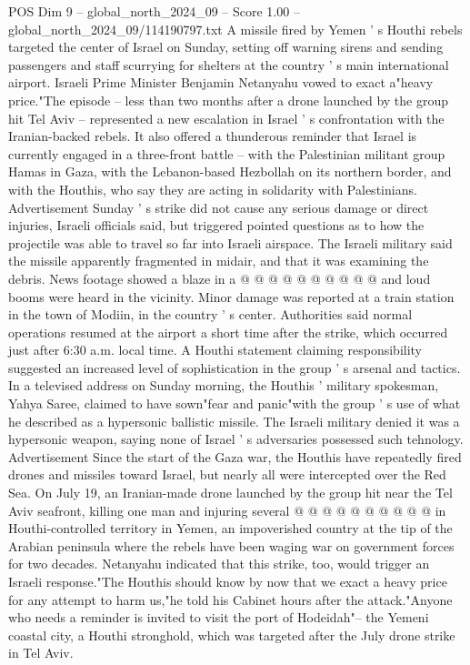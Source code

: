 \begin{textsample}{POS Dim 9 – global\_north\_2024\_09 – Score 1.00 – global\_north\_2024\_09/114190797.txt}  \label{ex:f9_pos_248}
A missile fired by Yemen ' s Houthi rebels targeted the center of Israel on Sunday, setting off warning sirens and sending passengers and staff scurrying for shelters at the country ' s main international airport.
Israeli Prime Minister Benjamin Netanyahu vowed to exact a"heavy price."The episode -- less than two months after a drone launched by the group hit Tel Aviv -- represented a new escalation in Israel ' s confrontation with the Iranian-backed rebels.
It also offered a thunderous reminder that Israel is currently engaged in a three-front battle -- with the Palestinian militant group Hamas in Gaza, with the Lebanon-based Hezbollah on its northern border, and with the Houthis, who say they are acting in solidarity with Palestinians.
Advertisement Sunday ' s strike did not cause any serious damage or direct injuries, Israeli officials said, but triggered pointed questions as to how the projectile was able to travel so far into Israeli airspace.
The Israeli military said the missile apparently fragmented in midair, and that it was examining the debris.
News footage showed a blaze in a @ @ @ @ @ @ @ @ @ @ and loud booms were heard in the vicinity.
Minor damage was reported at a train station in the town of Modiin, in the country ' s center.
Authorities said normal operations resumed at the airport a short time after the strike, which occurred just after 6:30 a.m. local time.
A Houthi statement claiming responsibility suggested an increased level of sophistication in the group ' s arsenal and tactics.
In a televised address on Sunday morning, the Houthis ' military spokesman, Yahya Saree, claimed to have sown"fear and panic"with the group ' s use of what he described as a hypersonic ballistic missile.
The Israeli military denied it was a hypersonic weapon, saying none of Israel ' s adversaries possessed such tehnology.
Advertisement Since the start of the Gaza war, the Houthis have repeatedly fired drones and missiles toward Israel, but nearly all were intercepted over the Red Sea.
On July 19, an Iranian-made drone launched by the group hit near the Tel Aviv seafront, killing one man and injuring several @ @ @ @ @ @ @ @ @ @ in Houthi-controlled territory in Yemen, an impoverished country at the tip of the Arabian peninsula where the rebels have been waging war on government forces for two decades.
Netanyahu indicated that this strike, too, would trigger an Israeli response."The Houthis should know by now that we exact a heavy price for any attempt to harm us,"he told his Cabinet hours after the attack."Anyone who needs a reminder is invited to visit the port of Hodeidah"-- the Yemeni coastal city, a Houthi stronghold, which was targeted after the July drone strike in Tel Aviv.

\end{textsample}
